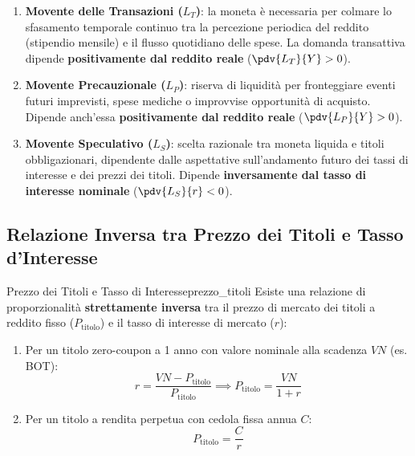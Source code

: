 \begin{enumerate}
    \item \textbf{Movente delle Transazioni ($L_T$)}: la moneta è necessaria per colmare lo sfasamento temporale continuo tra la percezione periodica del reddito (stipendio mensile) e il flusso quotidiano delle spese. La domanda transattiva dipende \textbf{positivamente dal reddito reale} ($\pdv{L_T}{Y} > 0$).
    
    \item \textbf{Movente Precauzionale ($L_P$)}: riserva di liquidità per fronteggiare eventi futuri imprevisti, spese mediche o improvvise opportunità di acquisto. Dipende anch'essa \textbf{positivamente dal reddito reale} ($\pdv{L_P}{Y} > 0$).
    
    \item \textbf{Movente Speculativo ($L_S$)}: scelta razionale tra moneta liquida e titoli obbligazionari, dipendente dalle aspettative sull'andamento futuro dei tassi di interesse e dei prezzi dei titoli. Dipende \textbf{inversamente dal tasso di interesse nominale} ($\pdv{L_S}{r} < 0$).
\end{enumerate}

\subsection{Relazione Inversa tra Prezzo dei Titoli e Tasso d'Interesse}

\begin{teorema}{Prezzo dei Titoli e Tasso di Interesse}{prezzo_titoli}
Esiste una relazione di proporzionalità \textbf{strettamente inversa} tra il prezzo di mercato dei titoli a reddito fisso ($P_{\text{titolo}}$) e il tasso di interesse di mercato ($r$):
\begin{enumerate}
    \item Per un titolo zero-coupon a 1 anno con valore nominale alla scadenza $VN$ (es. BOT):
    \begin{equation}
        r = \frac{VN - P_{\text{titolo}}}{P_{\text{titolo}}} \implies P_{\text{titolo}} = \frac{VN}{1 + r}
    \end{equation}
    \item Per un titolo a rendita perpetua con cedola fissa annua $C$:
    \begin{equation}
        P_{\text{titolo}} = \frac{C}{r}
    \end{equation}
\end{enumerate}
\end{teorema}

